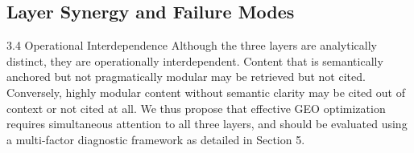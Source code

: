 \subsection{Layer Synergy and Failure Modes}

3.4 Operational Interdependence
Although the three layers are analytically distinct, they are operationally interdependent. Content that is semantically anchored but not pragmatically modular may be retrieved but not cited. Conversely, highly modular content without semantic clarity may be cited out of context or not cited at all. We thus propose that effective GEO optimization requires simultaneous attention to all three layers, and should be evaluated using a multi-factor diagnostic framework as detailed in Section 5.
